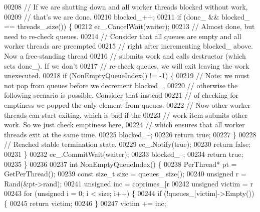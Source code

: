 \begin{DoxyCode}
{00208     \textcolor{comment}{// If we are shutting down and all worker threads blocked without work,}
00209     \textcolor{comment}{// that's we are done.}
00210     blocked\_++;
00211     \textcolor{keywordflow}{if} (done\_ && blocked\_ == threads\_.size()) \{
00212       ec\_.CancelWait(waiter);
00213       \textcolor{comment}{// Almost done, but need to re-check queues.}
00214       \textcolor{comment}{// Consider that all queues are empty and all worker threads are preempted}
00215       \textcolor{comment}{// right after incrementing blocked\_ above. Now a free-standing thread}
00216       \textcolor{comment}{// submits work and calls destructor (which sets done\_). If we don't}
00217       \textcolor{comment}{// re-check queues, we will exit leaving the work unexecuted.}
00218       \textcolor{keywordflow}{if} (NonEmptyQueueIndex() != -1) \{
00219         \textcolor{comment}{// Note: we must not pop from queues before we decrement blocked\_,}
00220         \textcolor{comment}{// otherwise the following scenario is possible. Consider that instead}
00221         \textcolor{comment}{// of checking for emptiness we popped the only element from queues.}
00222         \textcolor{comment}{// Now other worker threads can start exiting, which is bad if the}
00223         \textcolor{comment}{// work item submits other work. So we just check emptiness here,}
00224         \textcolor{comment}{// which ensures that all worker threads exit at the same time.}
00225         blocked\_--;
00226         \textcolor{keywordflow}{return} \textcolor{keyword}{true};
00227       \}
00228       \textcolor{comment}{// Reached stable termination state.}
00229       ec\_.Notify(\textcolor{keyword}{true});
00230       \textcolor{keywordflow}{return} \textcolor{keyword}{false};
00231     \}
00232     ec\_.CommitWait(waiter);
00233     blocked\_--;
00234     \textcolor{keywordflow}{return} \textcolor{keyword}{true};
00235   \}
00236 
00237   \textcolor{keywordtype}{int} NonEmptyQueueIndex() \{
00238     PerThread* pt = GetPerThread();
00239     \textcolor{keyword}{const} \textcolor{keywordtype}{size\_t} size = queues\_.size();
00240     \textcolor{keywordtype}{unsigned} r = Rand(&pt->rand);
00241     \textcolor{keywordtype}{unsigned} inc = coprimes\_[r %
00242     \textcolor{keywordtype}{unsigned} victim = r %
00243     \textcolor{keywordflow}{for} (\textcolor{keywordtype}{unsigned} i = 0; i < size; i++) \{
00244       \textcolor{keywordflow}{if} (!queues\_[victim]->Empty()) \{
00245         \textcolor{keywordflow}{return} victim;
00246       \}
00247       victim += inc;
}
\end{DoxyCode}
